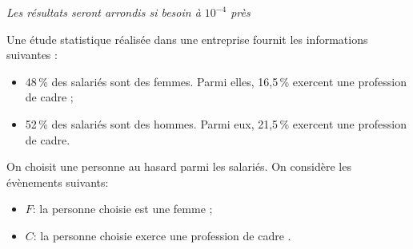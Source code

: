 \medskip

\emph{Les résultats seront arrondis si besoin à $10^{- 4}$ près}

\medskip

Une étude statistique réalisée dans une entreprise fournit les informations suivantes : 

\setlength\parindent{1cm}
\begin{itemize}
\item[$\bullet~~$] 48\,\% des salariés sont des femmes. Parmi elles, 16,5\,\% exercent une
profession de cadre ;
\item[$\bullet~~$] 52\,\% des salariés sont des hommes. Parmi eux, 21,5\,\% exercent une
profession de cadre.
\end{itemize}
\setlength\parindent{0cm}

\medskip

On choisit une personne au hasard parmi les salariés. On considère les évènements suivants:

\setlength\parindent{1cm}
\begin{itemize}
\item[$\bullet~~$] $F$: \og la personne choisie est une femme \fg{} ;
\item[$\bullet~~$] $C$: \og la personne choisie exerce une profession de cadre \fg.
\end{itemize}
\setlength\parindent{0cm}

\medskip

